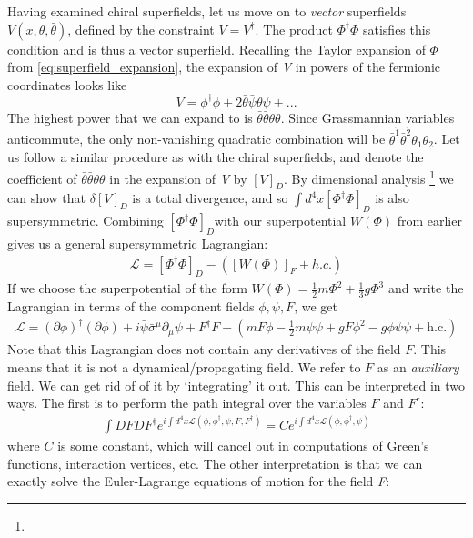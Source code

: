 Having examined chiral superfields, let us move on to \emph{vector} superfields $V(x,\theta,\bar{\theta})$, defined by the constraint $V = V^\dagger$. The product $\Phi^\dagger\Phi$ satisfies this condition and is thus a vector superfield. Recalling the Taylor expansion of $\Phi$ from \autoref{eq:superfield_expansion}, the expansion of \emph{V} in powers of the fermionic coordinates looks like
\[V = \phi^\dagger\phi + 2\bar{\theta}\bar{\psi}\theta\psi + ...\]
The highest power that we can expand to is $\bar{\theta}\bar{\theta}\theta\theta$. Since Grassmannian variables anticommute, the only non-vanishing quadratic combination will be $\bar{\theta}^{\dot{1}}\bar{\theta}^{\dot{2}}\theta_1\theta_2$. Let us follow a similar procedure as with the chiral superfields, and denote the coefficient of $\bar{\theta}\bar{\theta}\theta\theta$ in the expansion of \emph{V} by $[V]_D$. By dimensional analysis \footnote{} we can show that $\delta[V]_D$ is a total divergence, and so $\int d^4x[\Phi^\dagger\Phi]_D$ is also supersymmetric. Combining $[\Phi^\dagger\Phi]_D$with our superpotential $W(\Phi)$ from earlier gives us a general supersymmetric Lagrangian:
\begin{align*}
  \mathcal{L} = [\Phi^\dagger\Phi]_D - \left([W(\Phi)]_F + h.c.\right)
\end{align*}
If we choose the superpotential of the form $W(\Phi) = \frac{1}{2}m\Phi^2 + \frac{1}{3}g\Phi^3$ and write the Lagrangian in terms of the component fields $\phi,\psi,F$, we get
\begin{align*}
  \mathcal{L} = (\partial\phi)^\dagger(\partial\phi) + i\bar{\psi}\bar{\sigma}^\mu\partial_\mu\psi+F^\dagger F-\left(mF\phi-\frac{1}{2}m\psi\psi+gF\phi^2-g\phi\psi\psi + \text{h.c.}\right)
\end{align*}
Note that this Lagrangian does not contain any derivatives of the field $F$. This means that it is not a dynamical/propagating field. We refer to $F$ as an \emph{auxiliary} field. We can get rid of of it by `integrating' it out. This can be interpreted in two ways. The first is to perform the path integral over the variables $F$ and $F^\dagger$:
\begin{align*}
\int DFDF^\dagger e^{i\int d^4x \mathcal{L}(\phi,\phi^\dagger,\psi,F,F^\dagger)} = 
 C e^{i\int d^4x \mathcal{L}(\phi,\phi^\dagger,\psi)}
\end{align*}
where $C$ is some constant, which will cancel out in computations of Green's functions, interaction vertices, etc. The other interpretation is that we can exactly solve the Euler-Lagrange equations of motion for the field \emph{F}:
